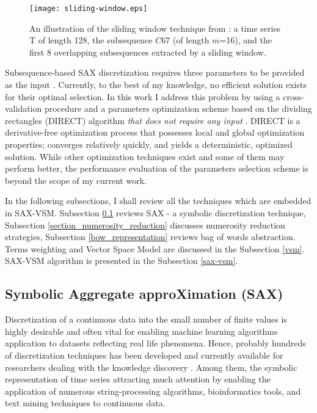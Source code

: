 \begin{figure}[t]
   \centering
   \texttt{[image: sliding-window.eps]}
   \caption{An illustration of the sliding window technique from \cite{citeulike:2821475}: a time series T of length 128, 
   the subsequence $C67$ (of length $m$=16), and the first 8 overlapping subsequences extracted by a sliding window.}
   \label{fig:sliding_window}
\end{figure}

Subsequence-based SAX discretization requires three parameters to be provided as the input \cite{citeulike:2821475}. 
Currently, to the best of my knowledge, no efficient solution exists for their optimal selection. 
In this work I address this problem by using a cross-validation procedure and a parameters optimization scheme based on the dividing 
rectangles (DIRECT) algorithm \textit{that does not require any input} \cite{citeulike:12563460}. 
DIRECT is a derivative-free optimization process that possesses local and global optimization properties; converges relatively quickly, 
and yields a deterministic, optimized solution. While other optimization techniques exist and some of them may perform better, 
the performance evaluation of the parameters selection scheme is beyond the scope of my current work.

In the following subsections, I shall review all the techniques which are embedded in SAX-VSM. 
Subsection \ref{section-sax} reviews SAX - a symbolic discretization technique, 
Subsection \ref{section_numerosity_reduction} discusses numerosity reduction strategies,
Subsection \ref{bow_representation} reviews bag of words abstraction.
Terms weighting and Vector Space Model are discussed in the Subsection \ref{vsm}. 
SAX-VSM algorithm is presented in the Subsection \ref{sax-vsm}. 


\subsection{Symbolic Aggregate approXimation (SAX)}\label{section-sax}
Discretization of a continuous data into the small number of finite values is highly desirable and often vital for enabling machine 
learning algorithms application to datasets reflecting real life phenomena. 
Hence, probably hundreds of discretization techniques has been developed and currently available for researchers dealing with 
the knowledge discovery \cite{citeulike:12394286}. Among them, the symbolic representation of time series attracting much attention by 
enabling the application of numerous string-processing algorithms, bioinformatics tools, and text mining techniques to continuous data.

